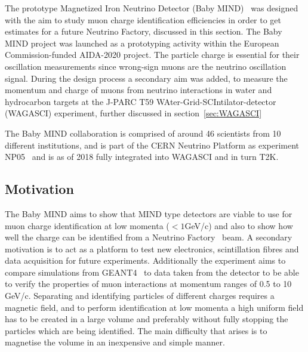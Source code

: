 
The prototype Magnetized Iron Neutrino Detector (Baby MIND)~\cite{26babyMIND} was designed with the aim to study muon charge identification efficiencies in order to get estimates for a future Neutrino Factory, discussed in this section. The Baby MIND project was launched as a prototyping activity within the European Commission-funded AIDA-2020 project. The particle charge is essential for their oscillation measurements since wrong-sign muons are the neutrino oscillation signal. During the design process a secondary aim was added, to measure the momentum and charge of muons from neutrino interactions in water and hydrocarbon targets at the J-PARC T59 WAter-Grid-SCIntilator-detector (WAGASCI) experiment, further discussed in section~\ref{sec:WAGASCI}

The Baby MIND collaboration is comprised of around 46 scientists from 10 different institutions, and is part of the CERN Neutrino Platform as experiment NP05~\cite{Fix2} and is as of 2018 fully integrated into WAGASCI and in turn T2K.

\subsection{Motivation}

The Baby MIND aims to show that MIND type detectors are viable to use for muon charge identification at low momenta ($<1$GeV/c) and also to show how well the charge can be identified from a Neutrino Factory~\cite{25NUfact} beam. A secondary motivation is to act as a platform to test new electronics, scintillation fibres and data acquisition for future experiments. Additionally the experiment aims to compare simulations from GEANT4~\cite{Geant4} to data taken from the detector to be able to verify the properties of muon interactions at momentum ranges of 0.5 to 10 GeV/c. Separating and identifying particles of different charges requires a magnetic field, and to perform identification at low momenta a high uniform field has to be created in a large volume and preferably without fully stopping the particles which are being identified. 
The main difficulty that arises is to magnetise the volume in an inexpensive and simple manner.


